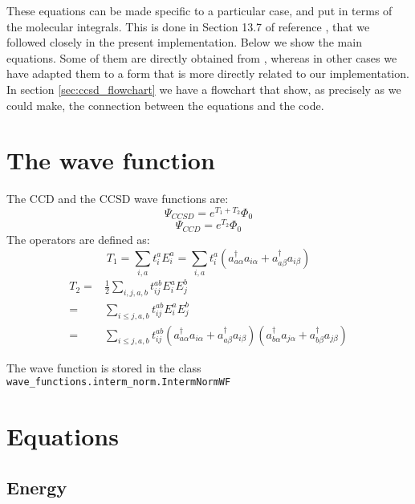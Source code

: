 These equations can be made specific to a particular case,
and put in terms of the molecular integrals.
This is done in Section 13.7 of reference \cite{}, that we followed closely in the present
implementation.
Below we show the main equations.
Some of them are directly obtained from \cite{},
whereas in other cases we have adapted them to a form that is more directly related to our implementation.
In section \ref{sec:ccsd_flowchart} we have a flowchart that show,
as precisely as we could make,
the connection between the equations and the code.

\section{The wave function}

The CCD and the CCSD wave functions are:
\begin{equation}
  \Psi_{CCSD} = e^{T_1 + T_2}\Phi_0
\end{equation}
\begin{equation}
  \Psi_{CCD} = e^{T_2}\Phi_0
\end{equation}
The operators are defined as:
\begin{equation}
  T_1 = \sum_{i,a} t_i^a E_i^a = \sum_{i,a} t_i^a (a_{a\alpha}^\dagger a_{i\alpha} + a_{a\beta}^\dagger a_{i\beta})
\end{equation}
\begin{equation}
  \begin{split}
    T_2 =& \frac{1}{2}\sum_{i,j,a,b} t_{ij}^{ab} E_i^aE_j^b\\
    =& \sum_{i \le j,a,b} t_{ij}^{ab} E_i^aE_j^b\\
    =& \sum_{i \le j,a,b} t_{ij}^{ab} (a_{a\alpha}^\dagger a_{i\alpha} + a_{a\beta}^\dagger a_{i\beta})
    (a_{b\alpha}^\dagger a_{j\alpha} + a_{b\beta}^\dagger a_{j\beta})
  \end{split}
\end{equation}

The wave function is stored in the class \texttt{wave\_functions.interm\_norm.IntermNormWF}


\section{Equations}

\subsection{Energy}
\hypertarget{sec:ccsd_energy}{}
\label{sec:ccsd_energy}

